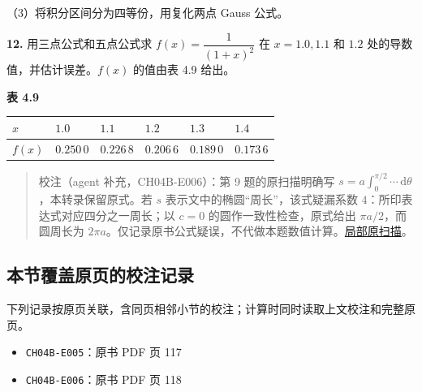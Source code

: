 \documentclass[
  10pt,
  fontset=fandol]{ctexart}
\newcounter{none} %
\providecommand{\tightlist}{%
  \setlength{\itemsep}{0pt}\setlength{\parskip}{0pt}}
\begin{document}
（3）将积分区间分为四等份，用复化两点 Gauss 公式。

\textbf{12.} 用三点公式和五点公式求 \(f(x)=\dfrac1{(1+x)^2}\) 在 \(x=1.0,1.1\) 和 \(1.2\) 处的导数值，并估计误差。\(f(x)\) 的值由表 4.9 给出。

\textbf{表 4.9}

{\def\LTcaptype{none} %
\begin{longtable}[]{@{}
  >{\centering\arraybackslash}p{}
  >{\centering\arraybackslash}p{}
  >{\centering\arraybackslash}p{}
  >{\centering\arraybackslash}p{}
  >{\centering\arraybackslash}p{}
  >{\centering\arraybackslash}p{}@{}}
\toprule\noalign{}
\begin{minipage}[b]{\linewidth}\centering
\(x\)
\end{minipage} & \begin{minipage}[b]{\linewidth}\centering
\(1.0\)
\end{minipage} & \begin{minipage}[b]{\linewidth}\centering
\(1.1\)
\end{minipage} & \begin{minipage}[b]{\linewidth}\centering
\(1.2\)
\end{minipage} & \begin{minipage}[b]{\linewidth}\centering
\(1.3\)
\end{minipage} & \begin{minipage}[b]{\linewidth}\centering
\(1.4\)
\end{minipage} \\
\midrule\noalign{}
\endhead
\bottomrule\noalign{}
\endlastfoot
\(f(x)\) & \(0.250\,0\) & \(0.226\,8\) & \(0.206\,6\) & \(0.189\,0\) & \(0.173\,6\) \\
\end{longtable}
}

\begin{quote}
校注（agent 补充，CH04B-E006）：第 9 题的原扫描明确写 \(s=a\int_0^{\pi/2}\cdots\,\mathrm{d}\theta\)，本转录保留原式。若 \(s\) 表示文中的椭圆``周长''，该式疑漏系数 \(4\)：所印表达式对应四分之一周长；以 \(c=0\) 的圆作一致性检查，原式给出 \(\pi a/2\)，而圆周长为 \(2\pi a\)。仅记录原书公式疑误，不代做本题数值计算。\href{../assets/ch04b/review-p118-orbit.png}{局部原扫描}。
\end{quote}

\subsection{本节覆盖原页的校注记录}\label{ux672cux8282ux8986ux76d6ux539fux9875ux7684ux6821ux6ce8ux8bb0ux5f55}

下列记录按原页关联，含同页相邻小节的校注；计算时同时读取上文校注和完整原页。

\begin{itemize}
\tightlist
\item
  \texttt{CH04B-E005}：原书 PDF 页 117
\item
  \texttt{CH04B-E006}：原书 PDF 页 118
\end{itemize}
\end{document}

